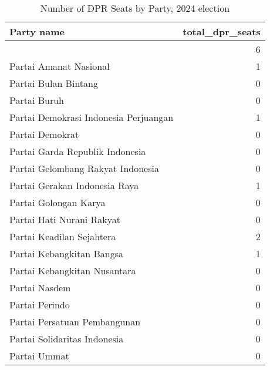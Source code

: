 
\begin{longtable}[t]{lr}
\caption{Number of DPR Seats by Party, 2024 election}\\
\toprule
Party name & total\_dpr\_seats\\
\midrule
 & 6\\
Partai Amanat Nasional & 1\\
Partai Bulan Bintang & 0\\
Partai Buruh & 0\\
Partai Demokrasi Indonesia Perjuangan & 1\\
\addlinespace
Partai Demokrat & 0\\
Partai Garda Republik Indonesia & 0\\
Partai Gelombang Rakyat Indonesia & 0\\
Partai Gerakan Indonesia Raya & 1\\
Partai Golongan Karya & 0\\
\addlinespace
Partai Hati Nurani Rakyat & 0\\
Partai Keadilan Sejahtera & 2\\
Partai Kebangkitan Bangsa & 1\\
Partai Kebangkitan Nusantara & 0\\
Partai Nasdem & 0\\
\addlinespace
Partai Perindo & 0\\
Partai Persatuan Pembangunan & 0\\
Partai Solidaritas Indonesia & 0\\
Partai Ummat & 0\\
\bottomrule
\end{longtable}
